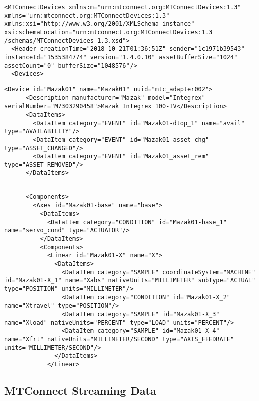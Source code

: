 \begin{lstlisting}[caption={Device Header},label={lst:device-header}]
<MTConnectDevices xmlns:m="urn:mtconnect.org:MTConnectDevices:1.3" xmlns="urn:mtconnect.org:MTConnectDevices:1.3" xmlns:xsi="http://www.w3.org/2001/XMLSchema-instance" xsi:schemaLocation="urn:mtconnect.org:MTConnectDevices:1.3 /schemas/MTConnectDevices_1.3.xsd">
  <Header creationTime="2018-10-21T01:36:51Z" sender="1c1971b39543" instanceId="1535384774" version="1.4.0.10" assetBufferSize="1024" assetCount="0" bufferSize="1048576"/>
  <Devices>
\end{lstlisting}

\begin{lstlisting}[firstnumber=last,%
    caption={Device Model},label={lst:device-model}]
    <Device id="Mazak01" name="Mazak01" uuid="mtc_adapter002">
      <Description manufacturer="Mazak" model="Integrex" serialNumber="M7303290458">Mazak Integrex 100-IV</Description>
      <DataItems>
        <DataItem category="EVENT" id="Mazak01-dtop_1" name="avail" type="AVAILABILITY"/>
        <DataItem category="EVENT" id="Mazak01_asset_chg" type="ASSET_CHANGED"/>
        <DataItem category="EVENT" id="Mazak01_asset_rem" type="ASSET_REMOVED"/>
      </DataItems>
\end{lstlisting}


\begin{lstlisting}[firstnumber=last,%
    caption={Components},label={lst:device-component}]

      <Components>
        <Axes id="Mazak01-base" name="base">
          <DataItems>
            <DataItem category="CONDITION" id="Mazak01-base_1" name="servo_cond" type="ACTUATOR"/>
          </DataItems>
          <Components>
            <Linear id="Mazak01-X" name="X">
              <DataItems>
                <DataItem category="SAMPLE" coordinateSystem="MACHINE" id="Mazak01-X_1" name="Xabs" nativeUnits="MILLIMETER" subType="ACTUAL" type="POSITION" units="MILLIMETER"/>
                <DataItem category="CONDITION" id="Mazak01-X_2" name="Xtravel" type="POSITION"/>
                <DataItem category="SAMPLE" id="Mazak01-X_3" name="Xload" nativeUnits="PERCENT" type="LOAD" units="PERCENT"/>
                <DataItem category="SAMPLE" id="Mazak01-X_4" name="Xfrt" nativeUnits="MILLIMETER/SECOND" type="AXIS_FEEDRATE" units="MILLIMETER/SECOND"/>
              </DataItems>
            </Linear>
\end{lstlisting}

\FloatBarrier

\subsection{MTConnect Streaming Data}

\UndefineShortVerb{\@}